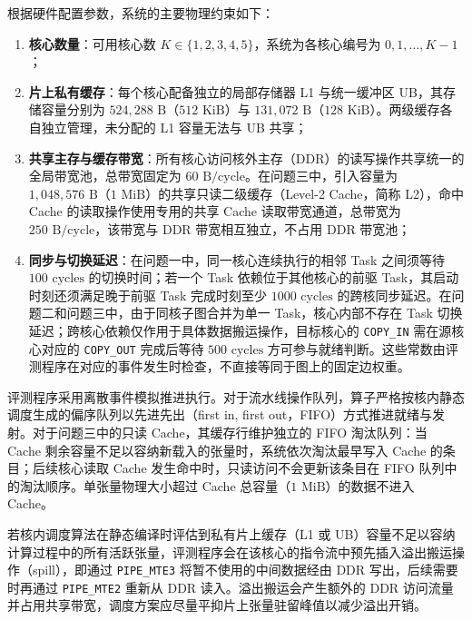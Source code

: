 \documentclass[anonymous,notoc]{gmcm2026}
\providecommand{\tightlist}{\setlength{\itemsep}{0pt}\setlength{\parskip}{0pt}}
\begin{document}
根据硬件配置参数，系统的主要物理约束如下：

\begin{enumerate}
\def\labelenumi{\arabic{enumi}.}
\tightlist
\item
  \textbf{核心数量}：可用核心数 \(K \in \{1, 2, 3, 4, 5\}\)，系统为各核心编号为 \(0, 1, \dots, K-1\)；
\item
  \textbf{片上私有缓存}：每个核心配备独立的局部存储器 L1 与统一缓冲区 UB，其存储容量分别为 \(524{,}288\text{ B}\)（\(512\text{ KiB}\)）与 \(131{,}072\text{ B}\)（\(128\text{ KiB}\)）。两级缓存各自独立管理，未分配的 L1 容量无法与 UB 共享；
\item
  \textbf{共享主存与缓存带宽}：所有核心访问核外主存（DDR）的读写操作共享统一的全局带宽池，总带宽固定为 \(60\text{ B/cycle}\)。在问题三中，引入容量为 \(1{,}048{,}576\text{ B}\)（\(1\text{ MiB}\)）的共享只读二级缓存（Level-2 Cache，简称 L2），命中 Cache 的读取操作使用专用的共享 Cache 读取带宽通道，总带宽为 \(250\text{ B/cycle}\)，该带宽与 DDR 带宽相互独立，不占用 DDR 带宽池；
\item
  \textbf{同步与切换延迟}：在问题一中，同一核心连续执行的相邻 Task 之间须等待 \(100\text{ cycles}\) 的切换时间；若一个 Task 依赖位于其他核心的前驱 Task，其启动时刻还须满足晚于前驱 Task 完成时刻至少 \(1000\text{ cycles}\) 的跨核同步延迟。在问题二和问题三中，由于同核子图合并为单一 Task，核心内部不存在 Task 切换延迟；跨核心依赖仅作用于具体数据搬运操作，目标核心的 \texttt{COPY\_IN} 需在源核心对应的 \texttt{COPY\_OUT} 完成后等待 \(500\text{ cycles}\) 方可参与就绪判断。这些常数由评测程序在对应的事件发生时检查，不直接等同于图上的固定边权重。
\end{enumerate}

评测程序采用离散事件模拟推进执行。对于流水线操作队列，算子严格按核内静态调度生成的偏序队列以先进先出（first in, first out，FIFO）方式推进就绪与发射。对于问题三中的只读 Cache，其缓存行维护独立的 FIFO 淘汰队列：当 Cache 剩余容量不足以容纳新载入的张量时，系统依次淘汰最早写入 Cache 的条目；后续核心读取 Cache 发生命中时，只读访问不会更新该条目在 FIFO 队列中的淘汰顺序。单张量物理大小超过 Cache 总容量（\(1\text{ MiB}\)）的数据不进入 Cache。

若核内调度算法在静态编译时评估到私有片上缓存（L1 或 UB）容量不足以容纳计算过程中的所有活跃张量，评测程序会在该核心的指令流中预先插入溢出搬运操作（spill），即通过 \texttt{PIPE\_MTE3} 将暂不使用的中间数据经由 DDR 写出，后续需要时再通过 \texttt{PIPE\_MTE2} 重新从 DDR 读入。溢出搬运会产生额外的 DDR 访问流量并占用共享带宽，调度方案应尽量平抑片上张量驻留峰值以减少溢出开销。
\end{document}
